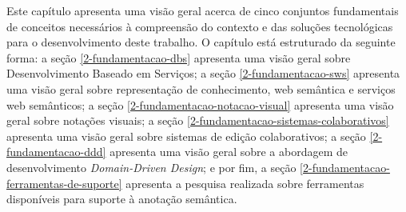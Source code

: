 Este capítulo apresenta uma visão geral acerca de cinco conjuntos fundamentais de conceitos necessários à compreensão do contexto e das soluções tecnológicas para o desenvolvimento deste trabalho. O capítulo está estruturado da seguinte forma: a seção \ref{2-fundamentacao-dbs} apresenta uma visão geral sobre Desenvolvimento Baseado em Serviços; a seção \ref{2-fundamentacao-sws} apresenta uma visão geral sobre representação de conhecimento, web semântica e serviços web semânticos; a seção \ref{2-fundamentacao-notacao-visual} apresenta uma visão geral sobre notações visuais; a seção \ref{2-fundamentacao-sistemas-colaborativos} apresenta uma visão geral sobre sistemas de edição colaborativos; a seção \ref{2-fundamentacao-ddd} apresenta uma visão geral sobre a abordagem de desenvolvimento \textit{Domain-Driven Design}; e por fim, a seção \ref{2-fundamentacao-ferramentas-de-suporte} apresenta a pesquisa realizada sobre ferramentas disponíveis para suporte à anotação semântica.